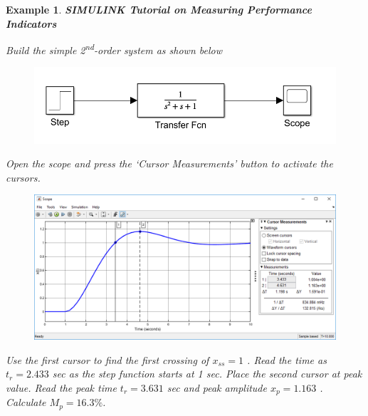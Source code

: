 \documentclass[12pt,letter]{article}
\newtheorem{ex}{Example}
\numberwithin{ex}{section} %
\newenvironment{example}{\begin{mdframed}[middlelinewidth=0.5mm]\begin{ex}\normalfont}{\end{ex}\end{mdframed}}
\numberwithin{re}{section} %
\numberwithin{equation}{section}	%
\begin{document}
\begin{example}

\textbf{SIMULINK Tutorial on Measuring Performance Indicators}

Build the simple 2\textsuperscript{nd}-order system as shown below
\begin{figure}[H]
	\centering
	\includegraphics[width=4.5in]{../figures/Simulink_step_model_transfer_2nd_oder}
\end{figure}
Open the scope and press the `Cursor Measurements' button to activate the cursors.

\begin{figure}[H]
	\centering
	\includegraphics[width=6.0in]{../figures/Simulink_step_model_transfer_cursor_measurements_2nd_oder}
\end{figure}

Use the first cursor to find the first crossing of $x_{ss} = 1$ . Read the time as $t_r = 2.433$ sec as the step function starts at 1 sec. Place the second cursor at peak value. Read the peak time $t_r = 3.631$ sec and peak amplitude
$x_p = 1.163$ . Calculate $M_p = 16.3\%$.

\end{example}


	\pagebreak
	\renewcommand{\thepage}{}
	\renewcommand\refname{References Cited}
	\pagestyle{plain}
	
	
\end{document}
